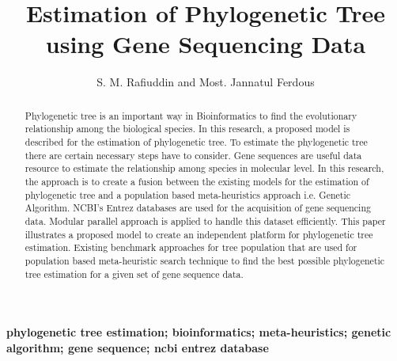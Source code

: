 \documentclass[preprint,12pt]{elsarticle}
\begin{document}
\begin{frontmatter}


\title{Estimation of Phylogenetic Tree using Gene Sequencing Data}




\author{S. M. Rafiuddin and Most. Jannatul Ferdous}

\address{Bangladesh University of Engineering and Technology, Dhaka}

\begin{abstract}
Phylogenetic tree is an important way in Bioinformatics to find the evolutionary relationship among the biological species. In this research, a proposed model is described for the estimation of phylogenetic tree. To estimate the phylogenetic tree there are certain necessary steps have to consider. Gene sequences are useful data resource to estimate the relationship among species in molecular level. In this research, the approach is to create a fusion between the existing models for the estimation of phylogenetic tree and a population based meta-heuristics approach i.e. Genetic Algorithm.  NCBI's Entrez databases are used for the acquisition of gene sequencing data. Modular parallel approach is applied to handle this dataset efficiently. This paper illustrates a proposed model to create an independent platform for phylogenetic tree estimation. Existing benchmark approaches for tree population that are used for population based meta-heuristic search technique to find the best possible phylogenetic tree estimation for a given set of gene sequence data.  
\end{abstract}

\begin{keyword}
\textbf{phylogenetic tree estimation; bioinformatics; meta-heuristics; genetic algorithm; gene sequence; ncbi entrez database}


\end{keyword}

\end{frontmatter}
\end{document}
